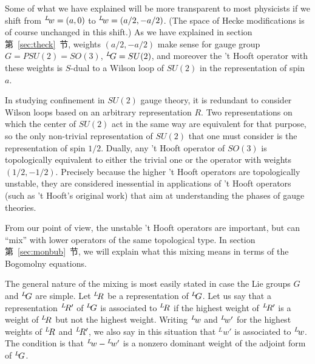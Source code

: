 Some of what we have explained will be more transparent to most
physicists if we shift from $^L\negthinspace w=(a,0)$ to
$^L\negthinspace w=(a/2,-a/2)$. (The space of Hecke modifications
is of course unchanged in this shift.) As we have explained in
section 第~\ref{sec:theck}~节, weights $(a/2,-a/2)$ make sense for gauge group
$G=PSU(2)=SO(3)$, $^L\negthinspace G=SU(2)$, and moreover the 't
Hooft operator with these weights is $S$-dual to a Wilson loop of
$SU(2)$ in the representation of spin $a$.

In studying confinement in $SU(2)$ gauge theory, it is redundant
to consider Wilson loops based on an arbitrary representation $R$.
Two representations on which the center of $SU(2)$ act in the same
way are equivalent for that purpose, so the only non-trivial
representation of $SU(2)$ that one must consider is the
representation of spin $1/2$.   Dually, any 't Hooft operator of
$SO(3)$ is topologically equivalent to either the trivial one or
the operator with weights $(1/2,-1/2)$.  Precisely because the
higher 't Hooft operators are topologically unstable, they are
considered inessential in applications of 't Hooft operators (such
as 't Hooft's original work) that aim at understanding the phases
of gauge theories.

{}From our point of view, the unstable 't Hooft operators are
important, but can ``mix'' with lower operators of the same
topological type.  In section 第~\ref{sec:monbub}~节, we will explain what this
mixing means in terms of the Bogomolny equations.

The general nature of the mixing is most easily stated in case the
Lie groups $G$ and $^L\negthinspace G$ are simple.  Let
$^L\negthinspace R$ be a representation of $^L\negthinspace G$.
Let us say that a representation $^L\negthinspace R'$ of
$^L\negthinspace G$ is associated to $^L\negthinspace R$ if the
highest weight of $^L\negthinspace R'$ is a weight of
$^L\negthinspace R$ but not the highest weight. Writing
$^L\negthinspace w$ and $^L\negthinspace w'$ for the highest
weights of $^L\negthinspace R$ and $^L\negthinspace R'$, we also
say in this situation that $^L w'$ is associated to
$^L\negthinspace w$. The condition is that $^L\negthinspace
w-{}^L\negthinspace w'$ is a nonzero dominant weight of the
adjoint form of $^L\negthinspace G$.

